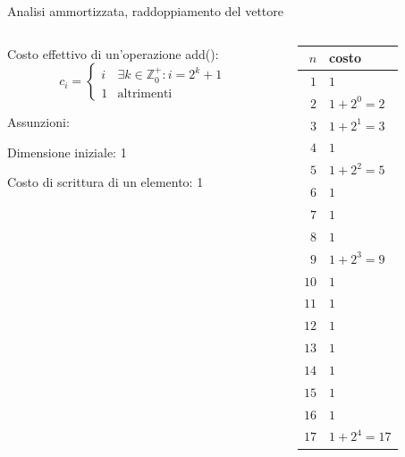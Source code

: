 \begin{frame}{Analisi ammortizzata, raddoppiamento del vettore}

\vspace{-9pt}
\begin{columns}[T]
\begin{column}{0.6\textwidth}
\alert{Costo effettivo di un'operazione \textsf{add}()}:
\[
c_i = \begin{cases} 
     i & \textrm{$\exists k \in \mathbb{Z}^{+}_0: i=2^k+1$}\\
     1 & \textrm{altrimenti}
  \end{cases}
\]

\bigskip
Assunzioni:
\BI
\item Dimensione iniziale: 1
\item Costo di scrittura di un elemento: 1
\EI

\end{column}
\hfill
\begin{column}{0.30\textwidth}
{\footnotesize
\begin{tabular}{|r|l|}
\hline
$n$ & costo \\
\hline
$1$ & $1$ \\
$2$ & $1 + 2^0 = 2$ \\
$3$ & $1 + 2^1 = 3$ \\
$4$ & $1$ \\
$5$ & $1 + 2^2 = 5$\\
$6$ & $1$ \\
$7$ & $1$ \\
$8$ & $1$ \\
$9$ & $1 + 2^3 = 9$ \\
$10$ & $1$ \\
$11$ & $1$ \\
$12$ & $1$ \\
$13$ & $1$ \\
$14$ & $1$ \\
$15$ & $1$ \\
$16$ & $1$ \\
$17$ & $1 + 2^4 = 17$ \\
\hline
\end{tabular}
}
\end{column}
\end{columns}


\end{frame}

